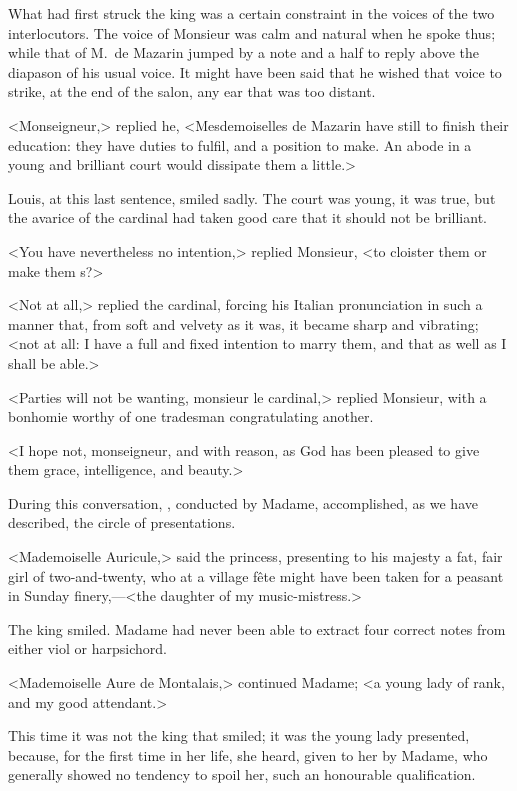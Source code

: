What had first struck the king was a certain constraint in the voices of the two interlocutors. The voice of Monsieur was calm and natural when he spoke thus; while that of M.~de Mazarin jumped by a note and a half to reply above the diapason of his usual voice. It might have been said that he wished that voice to strike, at the end of the salon, any ear that was too distant.

<Monseigneur,> replied he, <Mesdemoiselles de Mazarin have still to finish their education: they have duties to fulfil, and a position to make. An abode in a young and brilliant court would dissipate them a little.>

Louis, at this last sentence, smiled sadly. The court was young, it was true, but the avarice of the cardinal had taken good care that it should not be brilliant.

<You have nevertheless no intention,> replied Monsieur, <to cloister them or make them s?>

<Not at all,> replied the cardinal, forcing his Italian pronunciation in such a manner that, from soft and velvety as it was, it became sharp and vibrating; <not at all: I have a full and fixed intention to marry them, and that as well as I shall be able.>

<Parties will not be wanting, monsieur le cardinal,> replied Monsieur, with a bonhomie worthy of one tradesman congratulating another.

<I hope not, monseigneur, and with reason, as God has been pleased to give them grace, intelligence, and beauty.>

During this conversation, , conducted by Madame, accomplished, as we have described, the circle of presentations.

<Mademoiselle Auricule,> said the princess, presenting to his majesty a fat, fair girl of two-and-twenty, who at a village fête might have been taken for a peasant in Sunday finery,—<the daughter of my music-mistress.>

The king smiled. Madame had never been able to extract four correct notes from either viol or harpsichord.

<Mademoiselle Aure de Montalais,> continued Madame; <a young lady of rank, and my good attendant.>

This time it was not the king that smiled; it was the young lady presented, because, for the first time in her life, she heard, given to her by Madame, who generally showed no tendency to spoil her, such an honourable qualification.

